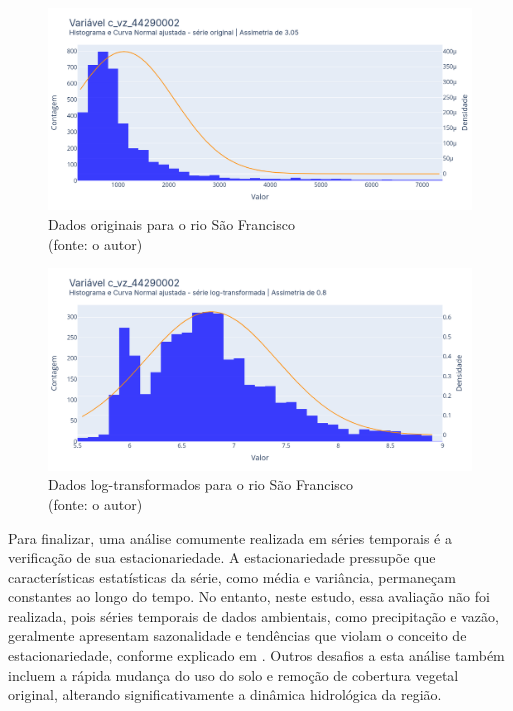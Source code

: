 \begin{figure}[!h]
	\centering
	\includegraphics[scale=0.33]{Figuras/rio_sao_francisco/rio_sao_francisco_antes_log.png}
	\caption{Dados originais para o rio São Francisco\\(fonte: o autor)}
	\label{fig:rio_sao_francisco_antes_log}
\end{figure}

\begin{figure}[!h]
	\centering
	\includegraphics[scale=0.33]{Figuras/rio_sao_francisco/rio_sao_francisco_depois_log.png}
	\caption{Dados log-transformados para o rio São Francisco\\(fonte: o autor)}
	\label{fig:rio_sao_francisco_depois_log}
\end{figure}
\clearpage

Para finalizar, uma análise comumente realizada em séries temporais é a verificação de sua estacionariedade. A estacionariedade pressupõe que características estatísticas da série, como média e variância, permaneçam constantes ao longo do tempo. No entanto, neste estudo, essa avaliação não foi realizada, pois séries temporais de dados ambientais, como precipitação e vazão, geralmente apresentam sazonalidade e tendências que violam o conceito de estacionariedade, conforme explicado em \citet{hyndman_fpp3_2024e}. Outros desafios a esta análise também incluem a rápida mudança do uso do solo e remoção de cobertura vegetal original, alterando significativamente a dinâmica hidrológica da região.\cite{rayyan-33388453}

